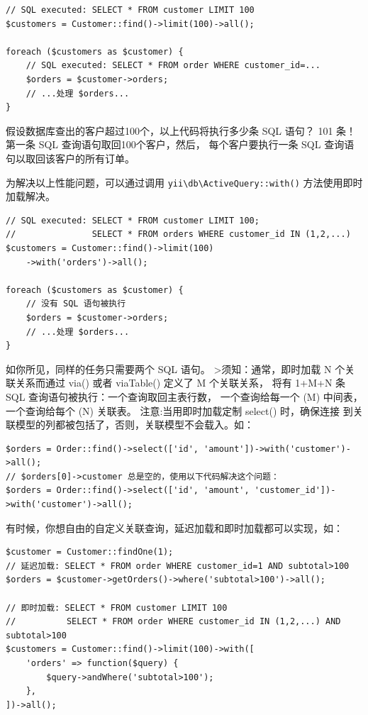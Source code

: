 \lstset{language=php}\begin{lstlisting}
// SQL executed: SELECT * FROM customer LIMIT 100
$customers = Customer::find()->limit(100)->all();

foreach ($customers as $customer) {
    // SQL executed: SELECT * FROM order WHERE customer_id=...
    $orders = $customer->orders;
    // ...处理 $orders...
}
\end{lstlisting}
假设数据库查出的客户超过100个，以上代码将执行多少条 SQL 语句？ 101 条！第一条 SQL 查询语句取回100个客户，然后， 每个客户要执行一条 SQL 查询语句以取回该客户的所有订单。

为解决以上性能问题，可以通过调用 \texttt{yii{\allowbreak{}\textbackslash}db{\allowbreak{}\textbackslash}ActiveQuery\allowbreak{}::\allowbreak{}with()} 方法使用即时加载解决。

\lstset{language=php}\begin{lstlisting}
// SQL executed: SELECT * FROM customer LIMIT 100;
//               SELECT * FROM orders WHERE customer_id IN (1,2,...)
$customers = Customer::find()->limit(100)
    ->with('orders')->all();

foreach ($customers as $customer) {
    // 没有 SQL 语句被执行
    $orders = $customer->orders;
    // ...处理 $orders...
}
\end{lstlisting}
如你所见，同样的任务只需要两个 SQL 语句。
>须知：通常，即时加载 N 个关联关系而通过 via() 或者 viaTable() 定义了 M 个关联关系， 将有 1+M+N 条 SQL 查询语句被执行：一个查询取回主表行数， 一个查询给每一个 (M) 中间表，一个查询给每个 (N) 关联表。
注意:当用即时加载定制 select() 时，确保连接 到关联模型的列都被包括了，否则，关联模型不会载入。如：

\lstset{language=php}\begin{lstlisting}
$orders = Order::find()->select(['id', 'amount'])->with('customer')->all();
// $orders[0]->customer 总是空的，使用以下代码解决这个问题：
$orders = Order::find()->select(['id', 'amount', 'customer_id'])->with('customer')->all();
\end{lstlisting}
有时候，你想自由的自定义关联查询，延迟加载和即时加载都可以实现，如：

\lstset{language=php}\begin{lstlisting}
$customer = Customer::findOne(1);
// 延迟加载: SELECT * FROM order WHERE customer_id=1 AND subtotal>100
$orders = $customer->getOrders()->where('subtotal>100')->all();

// 即时加载: SELECT * FROM customer LIMIT 100
//          SELECT * FROM order WHERE customer_id IN (1,2,...) AND subtotal>100
$customers = Customer::find()->limit(100)->with([
    'orders' => function($query) {
        $query->andWhere('subtotal>100');
    },
])->all();
\end{lstlisting}
